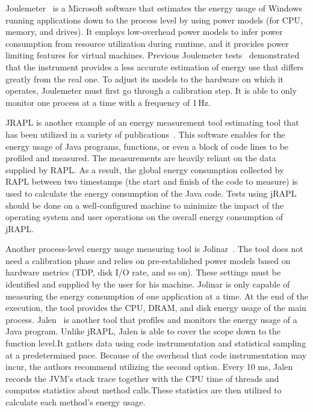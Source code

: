 Joulemeter~\cite{kothari2009joulemeter,jagroep2017energy} is a Microsoft software that estimates the energy usage of Windows running applications down to the process level by using power models (for CPU, memory, and drives).
It employs low-overhead power models to infer power consumption from resource utilization during runtime, and it provides power limiting features for virtual machines.
Previous Joulemeter tests~\cite{jagroep2015profiling} demonstrated that the instrument provides a less accurate estimation of energy use that differs greatly from the real one.
To adjust its models to the hardware on which it operates, Joulemeter must first go through a calibration step.
It is able to only monitor one process at a time with a frequency of 1\,Hz.

JRAPL is another example of an energy measurement tool estimating tool that has been utilized in a variety of publications~\cite{guimaraes2016some,liu_data-oriented_2015}.
This software enables for the energy usage of Java programs, functions, or even a block of code lines to be profiled and measured.
The measurements are heavily reliant on the data supplied by RAPL.
As a result, the global energy consumption collected by RAPL between two timestamps (the start and finish of the code to measure) is used to calculate the energy consumption of the Java code.
Tests using jRAPL should be done on a well-configured machine to minimize the impact of the operating system and user operations on the overall energy consumption of jRAPL.

Another process-level energy usage measuring tool is Jolinar~\cite{islam2016measuring,noureddine2016jolinar}.
The tool does not need a calibration phase and relies on pre-established power models based on hardware metrics (TDP, disk I/O rate, and so on).
These settings must be identified and supplied by the user for his machine.
Jolinar is only capable of measuring the energy consumption of one application at a time.
At the end of the execution, the tool provides the CPU, DRAM, and disk energy usage of the main process.
Jalen~\cite{noureddine2015monitoring} is another tool that profiles and monitors the energy usage of a Java program.
Unlike jRAPL, Jalen is able to cover the scope down to the function level.It gathers data using code instrumentation and statistical sampling at a predetermined pace.
Because of the overhead that code instrumentation may incur, the authors recommend utilizing the second option.
Every 10 ms, Jalen records the JVM's stack trace together with the CPU time of threads and computes statistics about method calls.These statistics are then utilized to calculate each method's energy usage.

